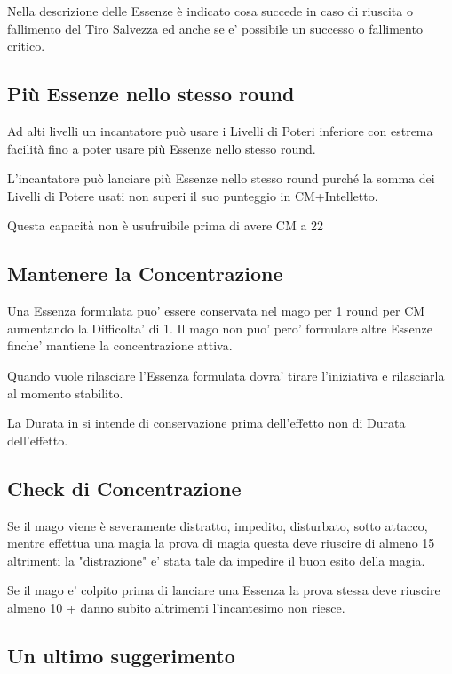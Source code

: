 \documentclass[a4paper,11pt,twoside,openany]{book}
\begin{document}
Nella descrizione delle Essenze è indicato cosa succede in caso di riuscita o fallimento del Tiro Salvezza ed anche se e' possibile un successo o fallimento critico.

\subsection{Più Essenze nello stesso round}

Ad alti livelli un incantatore può usare i Livelli di Poteri inferiore con estrema facilità fino a poter usare più Essenze nello stesso round.

L'incantatore può lanciare più Essenze nello stesso round purché la somma dei Livelli di Potere usati non superi il suo punteggio in CM+Intelletto.

Questa capacità non è usufruibile prima di avere CM a 22

\subsection{Mantenere la Concentrazione}

Una Essenza formulata puo' essere conservata nel mago per 1 round per CM aumentando la Difficolta' di 1.
Il mago non puo' pero' formulare altre Essenze finche' mantiene la concentrazione attiva.

Quando vuole rilasciare l'Essenza formulata dovra' tirare l'iniziativa e rilasciarla al momento stabilito.

La Durata in si intende di conservazione prima dell'effetto non di Durata dell'effetto.

\subsection{Check di Concentrazione}

Se il mago viene è severamente distratto, impedito, disturbato, sotto attacco, mentre effettua una magia la prova di magia questa deve riuscire di almeno 15 altrimenti la "distrazione" e' stata tale da impedire il buon esito della magia.

Se il mago e' colpito prima di lanciare una Essenza la prova stessa deve riuscire almeno 10 + danno subito altrimenti l'incantesimo non riesce.

\subsection{Un ultimo suggerimento}
\end{document}
